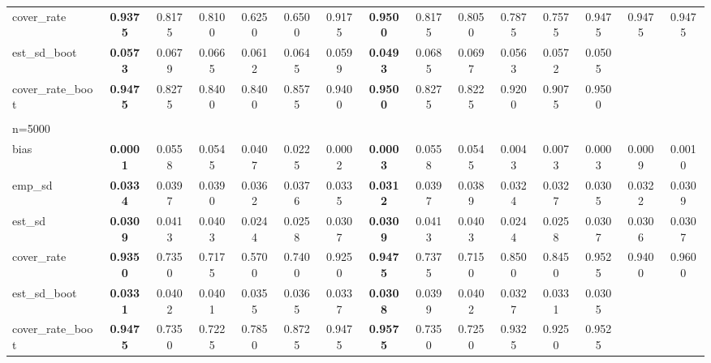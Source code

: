 \documentclass[11pt]{article}
\numberwithin{equation}{section}
\begin{document}
\begin{table}[]
{\begin{tabular}{lcccccccccccccc}
			cover\_rate & \textbf{0.9375} & 0.8175 & 0.8100 & 0.6250 & 0.6500 & 0.9175 & \textbf{0.9500} & 0.8175 & 0.8050 & 0.7875 & 0.7575 & 0.9475 & 0.9475 & 0.9475 \\
			est\_sd\_boot & \textbf{0.0573} & 0.0679 & 0.0665 & 0.0612 & 0.0645 & 0.0599 & \textbf{0.0493} & 0.0685 & 0.0697 & 0.0563 & 0.0572 & 0.0505 &  &  \\
			cover\_rate\_boot & \textbf{0.9475} & 0.8275 & 0.8400 & 0.8400 & 0.8575 & 0.9400 & \textbf{0.9500} & 0.8275 & 0.8225 & 0.9200 & 0.9075 & 0.9500 &  &  \\
			\\
			n=5000 &  &  &  &  &  &  &  &  &  &  &  &  &  &  \\
			\hline
			bias & \textbf{0.0001} & 0.0558 & 0.0545 & 0.0407 & 0.0225 & 0.0002 & \textbf{0.0003} & 0.0558 & 0.0545 & 0.0043 & 0.0073 & 0.0003 & 0.0009 & 0.0010 \\
			emp\_sd & \textbf{0.0334} & 0.0397 & 0.0390 & 0.0362 & 0.0376 & 0.0335 & \textbf{0.0312} & 0.0397 & 0.0389 & 0.0324 & 0.0327 & 0.0305 & 0.0322 & 0.0309 \\
			est\_sd & \textbf{0.0309} & 0.0413 & 0.0403 & 0.0244 & 0.0258 & 0.0307 & \textbf{0.0309} & 0.0413 & 0.0403 & 0.0244 & 0.0258 & 0.0307 & 0.0306 & 0.0307 \\
			cover\_rate & \textbf{0.9350} & 0.7350 & 0.7175 & 0.5700 & 0.7400 & 0.9250 & \textbf{0.9475} & 0.7375 & 0.7150 & 0.8500 & 0.8450 & 0.9525 & 0.9400 & 0.9600 \\
			est\_sd\_boot & \textbf{0.0331} & 0.0402 & 0.0401 & 0.0355 & 0.0365 & 0.0337 & \textbf{0.0308} & 0.0399 & 0.0402 & 0.0327 & 0.0331 & 0.0305 &  &  \\
			cover\_rate\_boot & \textbf{0.9475} & 0.7350 & 0.7225 & 0.7850 & 0.8725 & 0.9475 & \textbf{0.9575} & 0.7350 & 0.7250 & 0.9325 & 0.9250 & 0.9525 &  & \\
			\hline
		\end{tabular}
		\label{tab:simu_average_ate_p5}}
\end{table}
\end{document}
